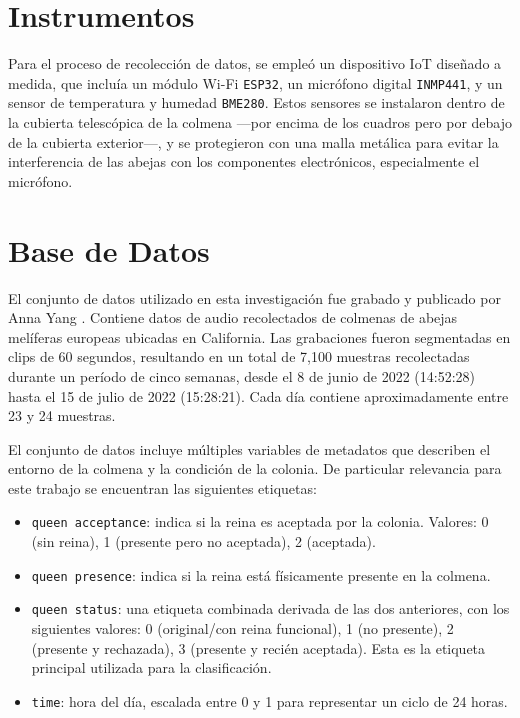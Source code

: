 \documentclass[12pt]{report}
\newenvironment{tightmulticols}{%
  \begin{multicols}{2}
  \setlength{\parskip}{0pt}
  \setlength{\parindent}{0em}
  \linespread{1}\selectfont
}{%
  \end{multicols}
}
\begin{document}
\begin{tightmulticols}
\section{Instrumentos}

\par Para el proceso de recolección de datos, se empleó un dispositivo IoT diseñado a medida, que incluía un módulo Wi-Fi \texttt{ESP32}, un micrófono digital \texttt{INMP441}, y un sensor de temperatura y humedad \texttt{BME280}. Estos sensores se instalaron dentro de la cubierta telescópica de la colmena —por encima de los cuadros pero por debajo de la cubierta exterior—, y se protegieron con una malla metálica para evitar la interferencia de las abejas con los componentes electrónicos, especialmente el micrófono.

\section{Base de Datos}

\par El conjunto de datos utilizado en esta investigación fue grabado y publicado por Anna Yang \cite{AnnaYang-Dataset}. Contiene datos de audio recolectados de colmenas de abejas melíferas europeas ubicadas en California. Las grabaciones fueron segmentadas en clips de 60 segundos, resultando en un total de 7,100 muestras recolectadas durante un período de cinco semanas, desde el 8 de junio de 2022 (14:52:28) hasta el 15 de julio de 2022 (15:28:21). Cada día contiene aproximadamente entre 23 y 24 muestras.

\par El conjunto de datos incluye múltiples variables de metadatos que describen el entorno de la colmena y la condición de la colonia. De particular relevancia para este trabajo se encuentran las siguientes etiquetas:

\begin{itemize}
	\item[\ding{43}] \texttt{queen acceptance}: indica si la reina es aceptada por la colonia. Valores: 0 (sin reina), 1 (presente pero no aceptada), 2 (aceptada).
	\item[\ding{43}] \texttt{queen presence}: indica si la reina está físicamente presente en la colmena.
	\item[\ding{43}] \texttt{queen status}: una etiqueta combinada derivada de las dos anteriores, con los siguientes valores: 0 (original/con reina funcional), 1 (no presente), 2 (presente y rechazada), 3 (presente y recién aceptada). Esta es la etiqueta principal utilizada para la clasificación.
	\item[\ding{43}] \texttt{time}: hora del día, escalada entre 0 y 1 para representar un ciclo de 24 horas.
\end{itemize}


\end{tightmulticols}
\end{document}
